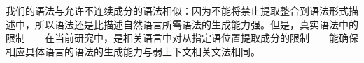 
    我们的语法与允许不连续成分的语法相似：因为不能将禁止提取整合到语法形式描述中，所以语法还是比描述自然语言所需语法的生成能力强。但是，真实语法中的限制——在当前研究中，是相关语言中对从指定语位置提取成分的限制——能确保相应具体语言的语法的生成能力与弱上下文相关文法相同。



